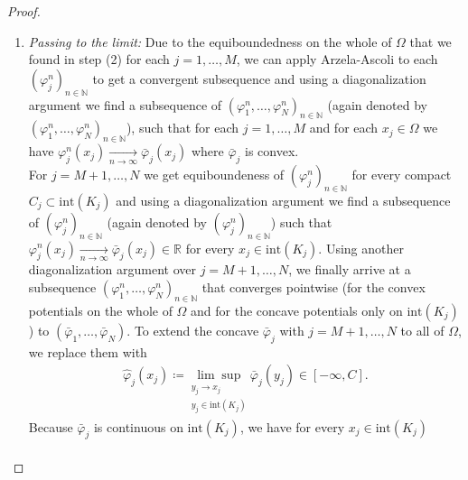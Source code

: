 \documentclass[10pt,a4paper]{amsart}
\newcommand{\RR}{\mathbb{R}}
\newcommand{\NN}{\mathbb{N}}
\newcommand{\dd}{\mathrm{d}}
\begin{document}
\begin{proof}
\begin{enumerate}
\begin{gather*}
	\end{gather*}
	Recalling that in step (3) we got $\varphi_j^n(x_j)\leq A$, with $A$ independent of $x_j$ and $n$, we get the lower bound
	\begin{align*}
		\varphi_j^n(x_j)&\geq A-\int_\Omega \big(A-\varphi_j^n(y)\big) \frac{\dd\beta_x}{\dd\mu_j}(y)\ \dd\mu_j(y)\\
		&\geq A-\Big\|\frac{\dd\beta_x}{\dd\mu_j}\Big\|_{L^\infty(\mu_j)}\int_\Omega \big(A-\varphi_j^n(y)\big) \ \dd\mu_j(y)\\
		&\geq A-L_{C_j}(A-C)
	\end{align*}
	which is independent of $x_j$ and $n$ (but still depends on $C_j$).
	\item \textit{Passing to the limit:}
	Due to the equiboundedness on the whole of $\Omega$ that we found in step (2) for each $j=1,\dots,M$, we can apply Arzela-Ascoli to each $(\varphi_j^n)_{n\in\NN}$ to get a convergent subsequence and using a diagonalization argument we find a subsequence of  $(\varphi_1^n,\dots,\varphi_N^n)_{n\in\NN}$ (again denoted by $(\varphi_1^n,\dots,\varphi_N^n)_{n\in\NN}$), such that for each $j=1,\dots,M$ and for each $x_j\in\Omega$ we have $\varphi_j^n(x_j)\underset{n\rightarrow\infty}{\longrightarrow}\bar\varphi_j(x_j)$ where $\bar\varphi_j$ is convex.\\
	For $j=M+1,\dots,N$ we get equiboundeness of $(\varphi_j^n)_{n\in\NN}$ for every compact $C_j\subset\text{int}(K_j)$ and using a diagonalization argument we find a subsequence of $(\varphi_j^n)_{n\in\NN}$ (again denoted by $(\varphi_j^n)_{n\in\NN}$) such that $\varphi_j^n(x_j)\underset{n\rightarrow\infty}{\longrightarrow}\bar\varphi_j(x_j)\in\RR$ for every $x_j\in\text{int}(K_j)$. Using another diagonalization argument over $j=M+1,\dots,N$, we finally arrive at a subsequence $(\varphi_1^n,\dots,\varphi_N^n)_{n\in\NN}$ that converges pointwise (for the convex potentials on the whole of $\Omega$ and for the concave potentials only on $\text{int}(K_j)$) to $(\bar\varphi_1,\dots,\bar\varphi_N)$. To extend the concave $\bar\varphi_j$ with $j=M+1,\dots,N$ to all of $\Omega$, we replace them with
	\begin{gather*}
		\hat\varphi_j(x_j)\coloneqq\underset{\substack{y_j\rightarrow x_j\\ y_j\in\text{int}(K_j)}}{\lim\sup}\bar\varphi_j(y_j)\in[-\infty,C].
	\end{gather*}
	Because $\bar\varphi_j$ is continuous on $\text{int}(K_j)$, we have for every $x_j\in \text{int}(K_j)$
	\begin{gather*}

\end{gather*}
\end{enumerate}
\end{proof}
\end{document}
